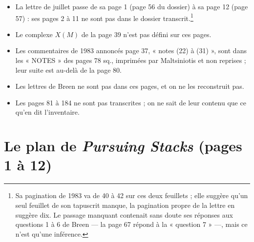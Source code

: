 \documentclass[11pt,a4paper]{article}
\begin{document}
\begin{itemize}
  \item La lettre de juillet passe de sa page 1 (page 56 du dossier) à sa
  page 12 (page 57) : ses pages 2 à 11 ne sont pas dans le dossier
  transcrit.\footnote{Sa pagination de 1983 va de 40 à 42 sur ces deux
  feuillets ; elle suggère qu'un seul feuillet de son tapuscrit manque, la
  pagination propre de la lettre en suggère dix. Le passage manquant
  contenait sans doute ses réponses aux questions 1 à 6 de Breen --- la
  page 67 répond à la « question 7 » ---, mais ce n'est qu'une inférence.}
  \item Le complexe $X(M)$ de la page 39 n'est pas défini sur ces pages.
  \item Les commentaires de 1983 annoncés page 37, « notes (22) à (31) »,
  sont dans les « NOTES » des pages 78 sq., imprimées par Maltsiniotis et
  non reprises ; leur suite est au-delà de la page 80.
  \item Les lettres de Breen ne sont pas dans ces pages, et on ne les
  reconstruit pas.
  \item Les pages 81 à 184 ne sont pas transcrites ; on ne sait de leur
  contenu que ce qu'en dit l'inventaire.
\end{itemize}

\section*{Le plan de \emph{Pursuing Stacks} (pages 1 à 12)}
\end{document}
